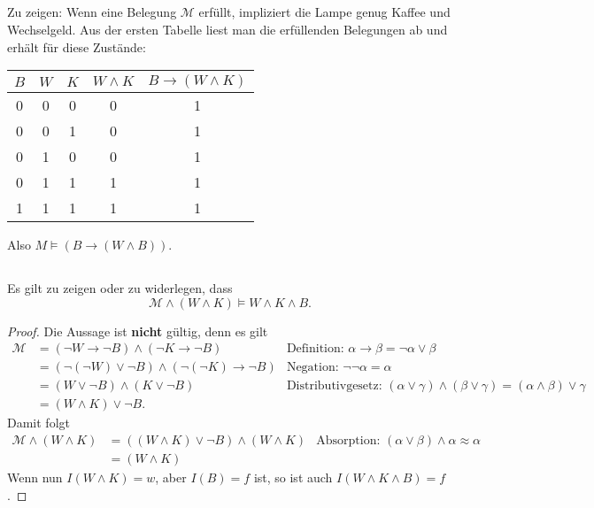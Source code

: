 \documentclass[a4paper]{article}
\begin{document}
\subsection{}
Zu zeigen: Wenn eine Belegung $\mathcal M$ erfüllt, impliziert die Lampe genug Kaffee und Wechselgeld.
Aus der ersten Tabelle liest man die erfüllenden Belegungen ab und erhält für diese Zustände:
\begin{center}
\begin{tabular}{c|c|c|c||c}
$B$ & $W$ & $K$ & $W\wedge K$ & $B\to (W\wedge K)$\\ \hline
0&0&0&0&1\\
0&0&1&0&1\\
0&1&0&0&1\\
0&1&1&1&1\\
1&1&1&1&1
\end{tabular}
\end{center}
Also $M\vDash \left( B\to (W\wedge B)\right)$.

\subsection{}
Es gilt zu zeigen oder zu widerlegen, dass
$$\mathcal M \wedge (W\wedge K) \vDash W\wedge K\wedge B.$$
\begin{proof}
Die Aussage ist \textbf{nicht} gültig, denn es gilt
\begin{align*}
\mathcal M &= (\neg W \to \neg B) \wedge (\neg K\to \neg B) &\text{Definition: $α\to β = \neg α \vee β$}\\
&= \left( \neg(\neg W) \vee \neg B \right) \wedge \left( \neg(\neg K) \to \neg B \right) &\text{Negation: $\neg\neg α = α$}\\
&= ( W\vee \neg B) \wedge ( K \vee \neg B) &\text{Distributivgesetz: $(α\vee γ) \wedge (β\vee γ) = (α\wedge β)\vee γ$}\\
&= (W\wedge K) \vee \neg B.
\end{align*}
Damit folgt
\begin{align*}
\mathcal M \wedge ( W\wedge K) &= \left( (W\wedge K) \vee \neg B\right) \wedge (W\wedge K) &\text{Absorption: $(α\vee β) \wedge α \approx α$}\\
&= (W\wedge K)
\end{align*}
Wenn nun $I(W\wedge K) = w$, aber $I(B) = f$ ist, so ist auch $I(W\wedge K\wedge B) = f$.
\end{proof}
\end{document}
